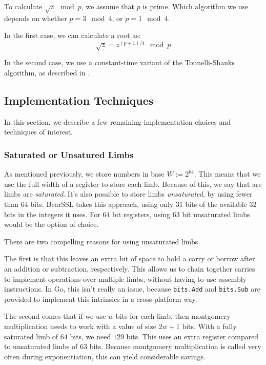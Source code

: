 \documentclass[11pt, a4paper]{article} %
\begin{document}
{To calculate $\sqrt{z} \mod p$, we assume that $p$ is prime.
Which algorithm we use depends on whether $p = 3 \mod 4$,
or $p = 1 \mod 4$.

In the first case, we can calculate a root as:
$$
\sqrt{z} = z^{(p + 1) / 4} \mod p
$$

In the second case, we use a constant-time variant
of the Tonnelli-Shanks algorithm, as described in 
\cite{wahby_hashing_nodate}.

\subsection{Implementation Techniques}

In this section, we describe a few remaining implementation choices
and techniques of interest.

\subsubsection{Saturated or Unsatured Limbs}

As mentioned previously, we store numbers in base
$W := 2^{64}$. This means that we use the full width of a register
to store each limb. Because of this, we say that are limbs
are \emph{saturated}. It's also possible to store
limbs \emph{unsaturated}, by using fewer than $64$ bits.
BearSSL 
\cite{pornin_bearssl_2020-1}
takes this approach, using only $31$ bits of the available $32$ bits
in the integers it uses. For $64$ bit registers, using $63$ bit unsaturated
limbs would be the option of choice.

There are two compelling reasons for using unsaturated limbs.

The first is that this leaves an extra bit of space to hold a carry
or borrow after an addition or subtraction, respectively. This allows
us to chain together carries to implement operations over multiple
limbs, without having to use assembly instructions. In Go,
this isn't really an issue, because \texttt{bits.Add} and
\texttt{bits.Sub} are provided to implement this intrinsics
in a cross-platform way.

The second comes that if we use $w$ bits for each limb, then montgomery
multiplication needs to work with a value of size $2w + 1$ bits. With a fully
saturated limb of $64$ bits, we need $129$ bits. This uses
an extra register compared to unsaturated limbs of $63$ bits. Because
montgomery multiplication is called very often during exponentiation,
this can yield considerable savings.

}
\end{document}
